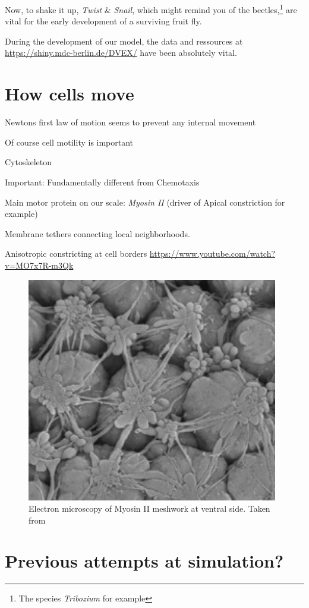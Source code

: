 \noindent
Now, to shake it up, \textit{Twist} \& \textit{Snail}, which might remind you of the beetles,\footnote{The species \textit{Tribozium} for example\cite{sommer1994expression}} are vital for the early development of a surviving fruit fly.


During the development of our model, the data and ressources at \url{https://shiny.mdc-berlin.de/DVEX/} have been absolutely vital.

\section{How cells move}
Newtons first law of motion seems to prevent any internal movement

Of course cell motility is important 


Cytoskeleton

Important: Fundamentally different from Chemotaxis 

Main motor protein on our scale:  \textit{Myosin II} (driver of Apical constriction for example) 

Membrane tethers connecting local neighborhoods.

Anisotropic constricting at cell borders \url{https://www.youtube.com/watch?v=MO7x7R-m3Qk}


\begin{figure}[H]
    \centering
    \includegraphics[width=0.6\linewidth]{chapters/Theory/figures/EM_constricting_proteins.png}
    \caption{Electron microscopy of Myosin II meshwork at ventral side. Taken from \cite{martin2010integration}}
    \label{fig:enter-label}
\end{figure}



\section{Previous attempts at simulation?}
